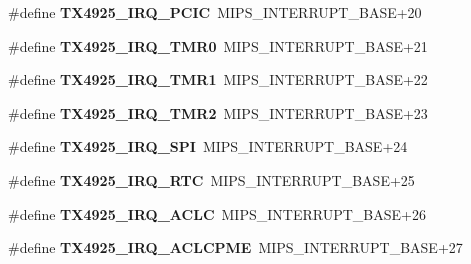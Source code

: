 \begin{DoxyCompactItemize}
\item 
\mbox{\label{group__bsp__interrupt_ga3cb27cd63a7eb7eff9c469e674f0a946}} 
\#define {\bfseries T\+X4925\+\_\+\+I\+R\+Q\+\_\+\+P\+C\+IC}~M\+I\+P\+S\+\_\+\+I\+N\+T\+E\+R\+R\+U\+P\+T\+\_\+\+B\+A\+SE+20
\item 
\mbox{\label{group__bsp__interrupt_gaf8125d0412a4524d8bd05373aa7959ee}} 
\#define {\bfseries T\+X4925\+\_\+\+I\+R\+Q\+\_\+\+T\+M\+R0}~M\+I\+P\+S\+\_\+\+I\+N\+T\+E\+R\+R\+U\+P\+T\+\_\+\+B\+A\+SE+21
\item 
\mbox{\label{group__bsp__interrupt_ga4c0dbf8fda1e911402f5bc54ced7e45f}} 
\#define {\bfseries T\+X4925\+\_\+\+I\+R\+Q\+\_\+\+T\+M\+R1}~M\+I\+P\+S\+\_\+\+I\+N\+T\+E\+R\+R\+U\+P\+T\+\_\+\+B\+A\+SE+22
\item 
\mbox{\label{group__bsp__interrupt_ga36878c7aa69a52eecfa9119bdd7b08e9}} 
\#define {\bfseries T\+X4925\+\_\+\+I\+R\+Q\+\_\+\+T\+M\+R2}~M\+I\+P\+S\+\_\+\+I\+N\+T\+E\+R\+R\+U\+P\+T\+\_\+\+B\+A\+SE+23
\item 
\mbox{\label{group__bsp__interrupt_gad4e003d01a65b84127e0964ab1c10a22}} 
\#define {\bfseries T\+X4925\+\_\+\+I\+R\+Q\+\_\+\+S\+PI}~M\+I\+P\+S\+\_\+\+I\+N\+T\+E\+R\+R\+U\+P\+T\+\_\+\+B\+A\+SE+24
\item 
\mbox{\label{group__bsp__interrupt_ga196109f4410c3b90217f9e324570cacb}} 
\#define {\bfseries T\+X4925\+\_\+\+I\+R\+Q\+\_\+\+R\+TC}~M\+I\+P\+S\+\_\+\+I\+N\+T\+E\+R\+R\+U\+P\+T\+\_\+\+B\+A\+SE+25
\item 
\mbox{\label{group__bsp__interrupt_gafb67777828f690fe4c464b936187d602}} 
\#define {\bfseries T\+X4925\+\_\+\+I\+R\+Q\+\_\+\+A\+C\+LC}~M\+I\+P\+S\+\_\+\+I\+N\+T\+E\+R\+R\+U\+P\+T\+\_\+\+B\+A\+SE+26
\item 
\mbox{\label{group__bsp__interrupt_ga989bd85b5af0977239bbda3e71a817c8}} 
\#define {\bfseries T\+X4925\+\_\+\+I\+R\+Q\+\_\+\+A\+C\+L\+C\+P\+ME}~M\+I\+P\+S\+\_\+\+I\+N\+T\+E\+R\+R\+U\+P\+T\+\_\+\+B\+A\+SE+27
\item 
\mbox{\label{group__bsp__interrupt_ga45ce3700aa1a0a6257aaf634ba600eb0}} 

\end{DoxyCompactItemize}
